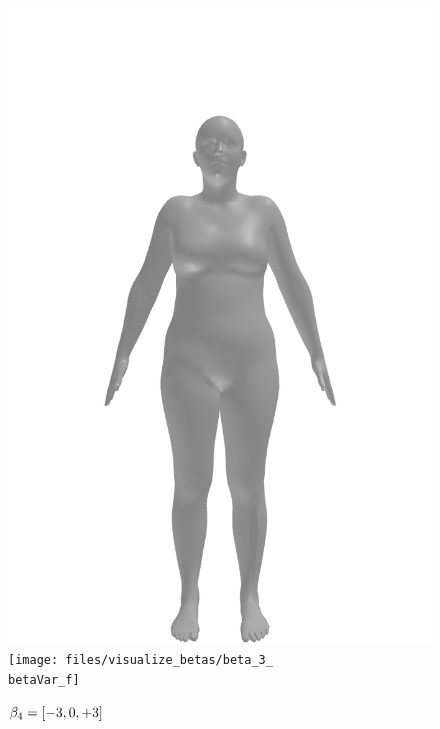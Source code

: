 \begin{figure}[ht!]
\begin{minipage}[b]{\textwidth}
        \includegraphics[width=\imgWidth]{files/visualize_betas/baseline_f}
        \texttt{[image: files/visualize\_betas/beta\_3\_\\betaVar\_f]}
        \caption{$\beta_4 = [-3, 0, +3]$}
    \end{minipage}
\end{figure}

